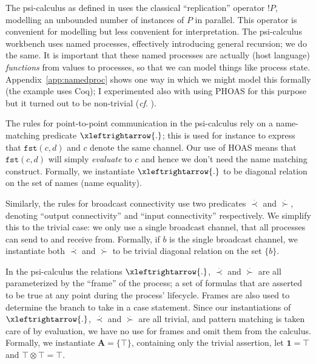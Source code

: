 \documentclass{article}
\newcommand{\psicalculus}{psi-calculus\xspace}
\begin{document}
The \psicalculus as defined in
\cite{DBLP:journals/corr/abs-1101-3262,Borgström2015} uses the classical
``replication'' operator $!P$, modelling an unbounded number of instances of $P$
in parallel. This operator is convenient for modelling but less convenient for
interpretation. The \psicalculus workbench
\cite{Borgstrom:2015:PWG:2724585.2682570} uses named processes, effectively
introducing general recursion; we do the same. It is important that these named
processes are actually (host language) \emph{functions} from values to
processes, so that we can model things like process state.
Appendix~\ref{app:namedproc} shows one way in which we might model this formally
(the example uses Coq); I experimented also with using PHOAS for this purpose
but it turned out to be non-trivial (\emph{cf}.
\cite{Chlipala:2010:VCI:1706299.1706312}).

The rules for point-to-point communication in the \psicalculus rely on a
name-matching predicate $\xleftrightarrow{.}$; this is used for instance to
express that $\mathtt{fst}(c,d)$ and $c$ denote the same channel. Our use of
HOAS means that $\mathtt{fst}(c,d)$ will simply \emph{evaluate} to $c$ and hence
we don't need the name matching construct. Formally, we instantiate
$\xleftrightarrow{.}$ to be diagonal relation on the set of names (name
equality).

Similarly, the rules for broadcast connectivity use two predicates
$\overset{.}{\prec}$ and $\overset{.}{\succ}$, denoting ``output connectivity''
and ``input connectivity'' respectively. We simplify this to the trivial case:
we only use a single broadcast channel, that all processes can send to and
receive from. Formally, if $b$ is the single broadcast channel, we instantiate
both $\overset{.}{\prec}$ and $\overset{.}{\succ}$ to be trivial diagonal
relation on the set $\{b\}$.

In the \psicalculus the relations $\xleftrightarrow{.}$, $\overset{.}{\prec}$
and $\overset{.}{\succ}$ are all parameterized by the ``frame'' of the process;
a set of formulas that are asserted to be true at any point during the process'
lifecycle. Frames are also used to determine the branch to take in a case
statement. Since our instantiations of $\xleftrightarrow{.}$,
$\overset{.}{\prec}$ and $\overset{.}{\succ}$ are all trivial, and pattern
matching is taken care of by evaluation, we have no use for frames and omit them
from the calculus. Formally, we instantiate $\mathbf{A} = \{\top\}$, containing
only the trivial assertion, let $\mathbf{1} = \top$ and $\top \otimes \top =
\top$.
\end{document}
